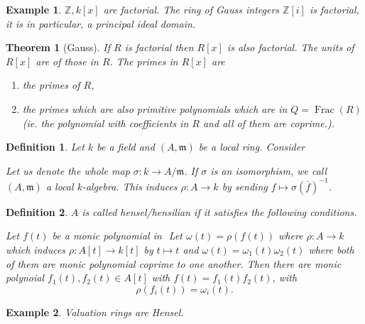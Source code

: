 \documentclass{article}
\newtheorem{theorem}{Theorem} [section]
\newtheorem{definition}{Definition}[section]
\newtheorem{example}{Example}[section]
\DeclareMathOperator{\Frac}{Frac}
\newcommand{\m}[0]{\mathfrak{m}}
\newcommand{\Z}[0]{\mathbb{Z}}
\begin{document}
\begin{example}
  $\Z,k[x]$ are factorial. The ring of Gauss integers $\Z[i]$ is factorial, it is in particular, a principal ideal domain.
\end{example}

\begin{theorem}[Gauss]
  \label{theorem_3_7}
  If $R$ is factorial then $R[x]$ is also factorial. The units of $R[x]$ are of those in $R$. The primes in $R[x]$ are 
  \begin{enumerate}[1).]
    \item the primes of $R$,
    \item the primes which are also primitive polynomials which are in $Q=\Frac (R)$(ie. the polynomial with coefficients in $R$ and all of them are coprime.).
  \end{enumerate}
\end{theorem}

\begin{definition}
  Let $k$ be a field and $(A,\mathfrak{m})$ be a local ring. Consider
  \begin{center}
  \end{center}
  Let us denote the whole map $\sigma:k\to A/\m$. If $\sigma$ is an isomorphism, we call $(A,\m)$ a local $k$-algebra. This induces $\rho:A\to k$ by sending $f\mapsto\sigma(\overline{f})^{-1}$.
\end{definition}

\begin{definition}
  $A$ is called hensel/hensilian if it satisfies the following conditions.
  \par Let $f(t)$ be a monic polynomial in $ $ Let $\omega(t) = \rho(f(t))$ where $\rho:A\to k$ which induces $\rho:A[t]\to k[t]$ by $t\mapsto t$ and $\omega(t) = \omega_1(t)\omega_2(t)$ where both of them are monic polynomial coprime to one another. Then there are monic polynoial $f_1(t),f_2(t)\in A[t]$ with $f(t) = f_1(t)f_2(t)$, with 
  \begin{equation*}
    \rho(f_i(t)) = \omega_i(t).
  \end{equation*}
\end{definition}

\begin{example}
  Valuation rings are Hensel.
\end{example}
\end{document}
